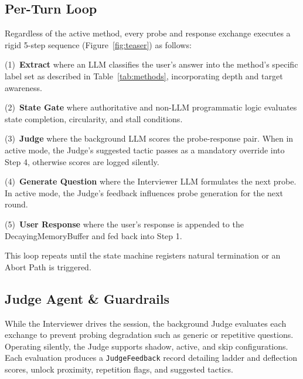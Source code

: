 \documentclass[sigconf,authordraft]{acmart}
\begin{document}
\subsection{Per-Turn Loop} \label{sec:loop}
Regardless of the active method, every probe and response exchange executes a rigid 5-step sequence (Figure~\ref{fig:teaser}) as follows:

(1)~\textbf{Extract} where an LLM classifies the user's answer into the method's specific label set as described in Table~\ref{tab:methods}, incorporating depth and target awareness.

(2)~\textbf{State Gate} where authoritative and non-LLM programmatic logic evaluates state completion, circularity, and stall conditions.

(3)~\textbf{Judge} where the background LLM scores the probe-response pair. When in active mode, the Judge's suggested tactic passes as a mandatory override into Step 4, otherwise scores are logged silently.

(4)~\textbf{Generate Question} where the Interviewer LLM formulates the next probe. In active mode, the Judge's feedback influences probe generation for the next round.

(5)~\textbf{User Response} where the user's response is appended to the DecayingMemoryBuffer and fed back into Step 1.

This loop repeats until the state machine registers natural termination or an Abort Path is triggered.

\subsection{Judge Agent \& Guardrails}
While the Interviewer drives the session, the background Judge evaluates each exchange to prevent probing degradation such as generic or repetitive questions. Operating silently, the Judge supports shadow, active, and skip configurations. Each evaluation produces a \texttt{JudgeFeedback} record detailing ladder and deflection scores, unlock proximity, repetition flags, and suggested tactics.
\end{document}
